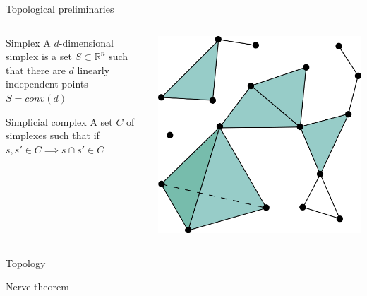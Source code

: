 \documentclass[unknownkeysallowed]{beamer}
\begin{document}
\begin{frame}{Topological preliminaries}

\begin{columns}[T]
\begin{column}{0.5\linewidth}

\begin{block}{Simplex}
A $d$-dimensional simplex is a set $S \subset \mathbb{R}^n$ such that there are $d$ linearly independent points $S = conv(d)$ 

\end{block}

\begin{block}{Simplicial complex}
A set $C$ of simplexes such that if $s, s' \in C \implies s \cap s' \in C$ 
\end{block}
\end{column}
\begin{column}{0.5\linewidth}
\includegraphics[width=\textwidth,height=0.5\textheight,right]{Simplicial_complex_example.svg.png}

\end{column}
\end{columns}
\end{frame}



\begin{frame}{Topology}

\begin{block}{Nerve theorem}

\end{block}
\end{frame}
\end{document}
